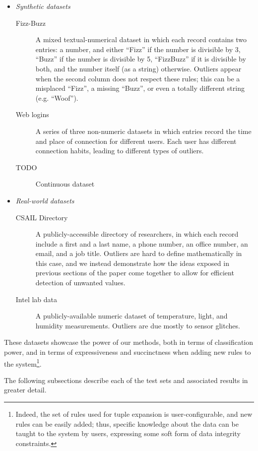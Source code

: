 \begin{itemize}
\item \emph{Synthetic datasets}
  \begin{description}
  \item[Fizz-Buzz] A mixed textual-numerical dataset in which each record contains two entries: a number, and either ``Fizz'' if the number is divisible by 3, ``Buzz'' if the number is divisible by 5, ``FizzBuzz'' if it is divisible by both, and the number itself (as a string) otherwise. Outliers appear when the second column does not respect these rules; this can be a misplaced ``Fizz'', a missing ``Buzz'', or even a totally different string (e.g. ``Woof'').
  \item[Web logins] A series of three non-numeric datasets in which entries record the time and place of connection for different users. Each user has different connection habits, leading to different types of outliers.
  \item[TODO] Continuous dataset
  \end{description}
\item \emph{Real-world datasets}
  \begin{description}
  \item[CSAIL Directory] A publicly-accessible directory of researchers, in which each record include a first and a last name, a phone number, an office number, an email, and a job title. Outliers are hard to define mathematically in this case, and we instead demonstrate how the ideas exposed in previous sections of the paper come together to allow for efficient detection of unwanted values.
  \item[Intel lab data] A publicly-available numeric dataset of temperature, light, and humidity measurements. Outliers are due mostly to sensor glitches.
  \end{description}
\end{itemize}

These datasets showcase the power of our methods, both in terms of classification power, and in terms of expressiveness and succinctness when adding new rules to the system\footnote{Indeed, the set of rules used for tuple expansion is user-configurable, and new rules can be easily added; thus, specific knowledge about the data can be taught to the system by users, expressing some soft form of data integrity constraints.}.

The following subsections describe each of the test sets and associated results in greater detail.





%
%
